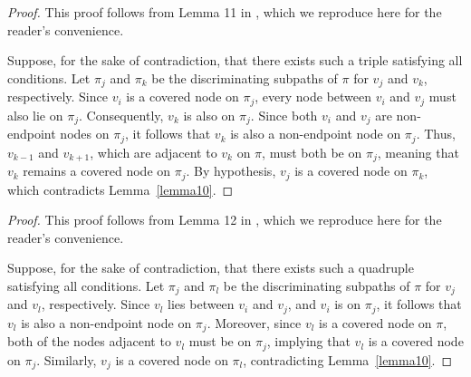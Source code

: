 \documentclass[accepted]{uai2025} %
\begin{document}
\lemmaeleven*
\begin{proof}
This proof follows from Lemma 11 in \citep{spirtes1996polynomial}, which we reproduce here for the reader's convenience.

Suppose, for the sake of contradiction, that there exists such a triple satisfying all conditions. Let \( \pi_j \) and \( \pi_k \) be the discriminating subpaths of \( \pi \) for \( v_j \) and \( v_k \), respectively. Since \( v_i \) is a covered node on \( \pi_j \), every node between \( v_i \) and \( v_j \) must also lie on \( \pi_j \). Consequently, \( v_k \) is also on \( \pi_j \). Since both \( v_i \) and \( v_j \) are non-endpoint nodes on \( \pi_j \), it follows that \( v_k \) is also a non-endpoint node on \( \pi_j \). Thus, \( v_{k-1} \) and \( v_{k+1} \), which are adjacent to \( v_k \) on $\pi$, must both be on \( \pi_j \), meaning that \( v_k \) remains a covered node on \( \pi_j \). By hypothesis, \( v_j \) is a covered node on \( \pi_k \), which contradicts Lemma~\ref{lemma10}.  
\end{proof}



\lemmatwelve*
\begin{proof}
This proof follows from Lemma 12 in \citep{spirtes1996polynomial}, which we reproduce here for the reader's convenience.

Suppose, for the sake of contradiction, that there exists such a quadruple satisfying all conditions. Let \( \pi_j \) and \( \pi_l \) be the discriminating subpaths of \( \pi \) for \( v_j \) and \( v_l \), respectively. Since \( v_l \) lies between \( v_i \) and \( v_j \), and \( v_i \) is on \( \pi_j \), it follows that \( v_l \) is also a non-endpoint node on \( \pi_j \). Moreover, since \( v_l \) is a covered node on \( \pi \), both of the nodes adjacent to \( v_l \) must be on \( \pi_j \), implying that \( v_l \) is a covered node on \( \pi_j \). Similarly, \( v_j \) is a covered node on \( \pi_l \), contradicting Lemma~\ref{lemma10}.
\end{proof}


\end{document}
